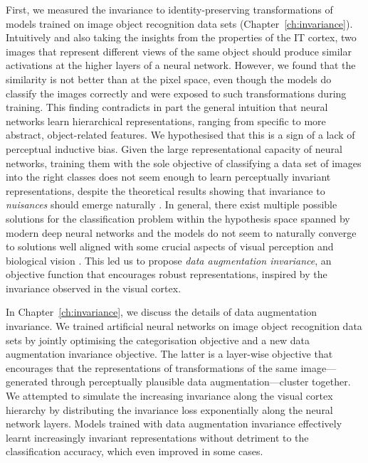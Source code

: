 {First, we measured the invariance to identity-preserving transformations of models trained on image object recognition data sets (Chapter~\ref{ch:invariance}). Intuitively and also taking the insights from the properties of the IT cortex, two images that represent different views of the same object should produce similar activations at the higher layers of a neural network. However, we found that the similarity is not better than at the pixel space, even though the models do classify the images correctly and were exposed to such transformations during training. This finding contradicts in part the general intuition that neural networks learn hierarchical representations, ranging from specific to more abstract, object-related features. We hypothesised that this is a sign of a lack of perceptual inductive bias. Given the large representational capacity of neural networks, training them with the sole objective of classifying a data set of images into the right classes does not seem enough to learn perceptually invariant representations, despite the theoretical results showing that invariance to \textit{nuisances} should emerge naturally \citep{achille2018emergence}. In general, there exist multiple possible solutions for the classification problem within the hypothesis space spanned by modern deep neural networks and the models do not seem to naturally converge to solutions well aligned with some crucial aspects of visual perception and biological vision \citep{sinz2019dlvsbrain, geirhos2020shortcutlearning, dujmovic2020adversarial}. This led us to propose \textit{data augmentation invariance}, an objective function that encourages robust representations, inspired by the invariance observed in the visual cortex.

In Chapter~\ref{ch:invariance}, we discuss the details of data augmentation invariance. We trained artificial neural networks on image object recognition data sets by jointly optimising the categorisation objective and a new data augmentation invariance objective. The latter is a layer-wise objective that encourages that the representations of transformations of the same image---generated through perceptually plausible data augmentation---cluster together. We attempted to simulate the increasing invariance along the visual cortex hierarchy by distributing the invariance loss exponentially along the neural network layers. Models trained with data augmentation invariance effectively learnt increasingly invariant representations without detriment to the classification accuracy, which even improved in some cases. 

}
